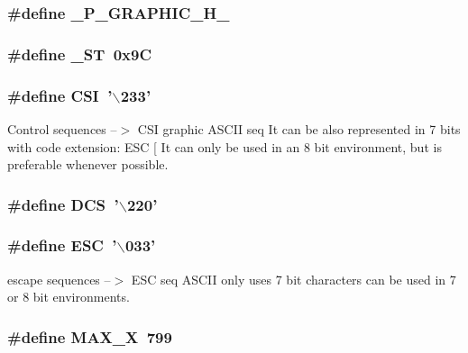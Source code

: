 \subsubsection{\setlength{\rightskip}{0pt plus 5cm}\#define \_\-P\_\-GRAPHIC\_\-H\_\-}\label{P__graphic_8h_a0}


\subsubsection{\setlength{\rightskip}{0pt plus 5cm}\#define \_\-ST\ 0x9C}\label{P__graphic_8h_a8}


\subsubsection{\setlength{\rightskip}{0pt plus 5cm}\#define CSI\ '$\backslash$233'}\label{P__graphic_8h_a3}


Control sequences --$>$ CSI graphic ASCII seq It can be also represented in 7 bits with code extension: ESC [ It can only be used in an 8 bit environment, but is preferable whenever possible.

\subsubsection{\setlength{\rightskip}{0pt plus 5cm}\#define DCS\ '$\backslash$220'}\label{P__graphic_8h_a5}


\subsubsection{\setlength{\rightskip}{0pt plus 5cm}\#define ESC\ '$\backslash$033'}\label{P__graphic_8h_a1}


escape sequences --$>$ ESC seq ASCII only uses 7 bit characters can be used in 7 or 8 bit environments.

\subsubsection{\setlength{\rightskip}{0pt plus 5cm}\#define MAX\_\-X\ 799}\label{P__graphic_8h_a11}


